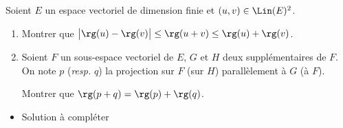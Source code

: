 \begin{enonce}
\begin{exercise}[ID={RMS134 E569},subtitle={Oral
    Mines-Ponts},theme={algebre},annee={2023},filiere={MP},concours={mines-ponts}]
  Soient $E$ un espace vectoriel de dimension finie et
$(u,v)\in\Lin(E)^2$.
\begin{enumerate}
\item Montrer que
  $\big|\rg(u)-\rg(v)\big|\le\rg(u+v)\le\rg(u)+\rg(v)$.
\item Soient $F$ un sous-espace vectoriel de $E$, $G$ et $H$ deux
  supplémentaires de $F$. On note $p$ (\emph{resp.} $q$) la projection
  sur $F$ (sur $H$) parallèlement à $G$ (à $F$).

  Montrer que $\rg(p+q)=\rg(p)+\rg(q)$.
\end{enumerate}
\end{exercise}
\begin{solution}
  \begin{itemize}
  \item Solution à compléter
  \end{itemize}
\end{solution}
\end{enonce}